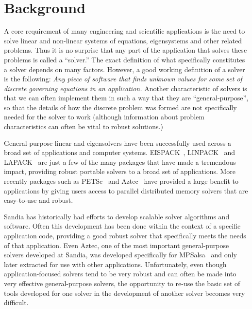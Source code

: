 \documentclass[12pt,relax]{TrilinosOverview}
\begin{document}
\section{Background}

A core requirement of many engineering and scientific applications is 
the need to solve linear and non-linear systems of equations, eigensystems 
and other related problems.  Thus it is no surprise that any 
part of the application that solves these problems is called a ``solver.'' 
The exact definition of what specifically constitutes a solver depends on 
many factors.  However, a good working definition of a solver is
the following: {\it Any piece of software that finds unknown values for 
some set of discrete governing equations in 
an application.}  Another characteristic of solvers is that we can often 
implement them in such a way that they are ``general-purpose'', so that the
details of how the discrete problem was formed are not specifically needed 
for the solver to work (although information about problem characteristics 
can often be vital to robust solutions.)

General-purpose linear and eigensolvers have been successfully used across 
a broad set of applications and computer systems.  EISPACK~\cite{eispack}, 
LINPACK~\cite{linpack} and LAPACK~\cite{lapack} are just a few of
the many packages that have made a tremendous impact, providing robust 
portable solvers to a broad set of applications.  More recently packages 
such as PETSc~\cite{petsc-home-page,petsc-manual,petsc-efficient} 
and Aztec~\cite{Aztec2.1} have provided a large
benefit to applications by giving users access to parallel distributed 
memory solvers that are easy-to-use and robust.

Sandia has historically had efforts to develop scalable solver algorithms 
and software.  Often this development has been done within the context of 
a specific application code, providing a good robust solver that 
specifically meets the needs of that application.  Even Aztec, one of 
the most important general-purpose solvers developed at Sandia, was 
developed specifically for MPSalsa~\cite{MPSalsa-User-Guide,MPSalsa-Theory} 
and only later extracted for use with other applications.  Unfortunately, 
even though application-focused solvers tend to be very robust and can 
often be made into very effective general-purpose solvers, the 
opportunity to re-use the basic set of tools developed for one solver 
in the development of another solver becomes very difficult.
\end{document}

